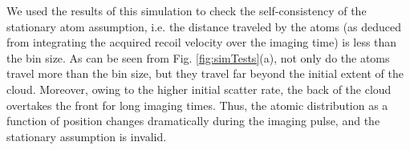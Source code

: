 \par We used the results of this simulation to check the self-consistency of the  stationary atom assumption, i.e. the distance traveled by the atoms (as deduced from integrating the acquired recoil velocity over the imaging time) is less than the bin size. As can be seen from Fig. \ref{fig:simTests}(a), not only do the atoms travel more than the bin size, but they travel far beyond the initial extent of the cloud. Moreover, owing to the higher initial scatter rate, the back of the cloud overtakes the front for long imaging times. Thus, the atomic distribution as a function of position changes dramatically during the imaging pulse, and the stationary assumption is invalid.
\begin{figure}

\end{figure}
